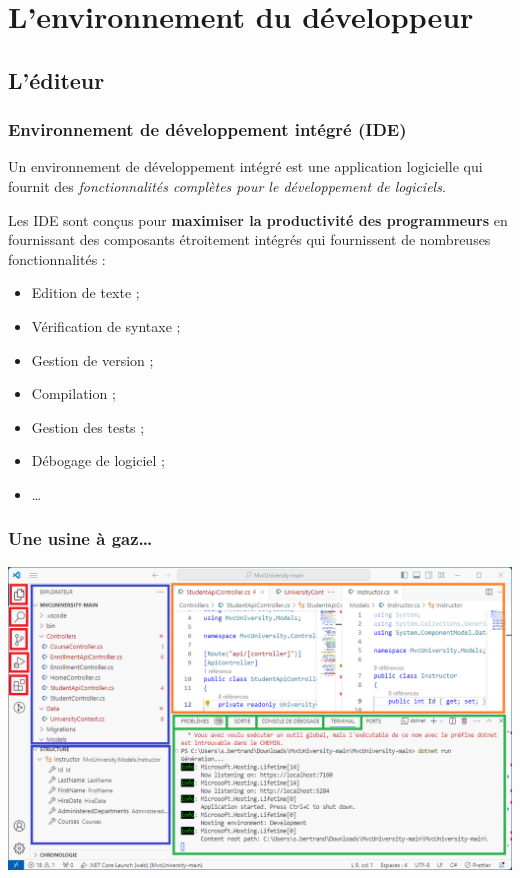 \section{L'environnement du développeur}
\label{sec:environnement}

\subsection{L'éditeur}
\label{subsec:editeur}

\begin{frame}
    \frametitle{Environnement de développement intégré (IDE)}

    Un environnement de développement intégré est une application logicielle
    qui fournit des \emph{fonctionnalités complètes pour le développement de logiciels}.

    Les IDE sont conçus pour \textbf{maximiser la productivité des programmeurs}
    en fournissant des composants étroitement intégrés qui fournissent de nombreuses fonctionnalités :
    \begin{itemize}
        \item Edition de texte ;
        \item Vérification de syntaxe ;
        \item Gestion de version ;
        \item Compilation ;
        \item Gestion des tests ;
        \item Débogage de logiciel ;
        \item \ldots
    \end{itemize}
\end{frame}

\begin{frame}
    \frametitle{Une usine à gaz\ldots}
    \centering
    \includegraphics[height=0.5\linewidth]{figures/environnement/vscode}
\end{frame}

